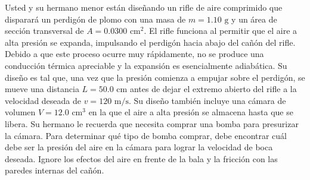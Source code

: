 \item Usted y su hermano menor están diseñando un rifle de aire comprimido que disparará un perdigón de plomo con una masa de $m = 1.10\text{ g}$ y un área de sección transversal de $A = 0.0300\text{ cm}^2$. El rifle funciona al permitir que el aire a alta presión se expanda, impulsando el perdigón hacia abajo del cañón del rifle. Debido a que este proceso ocurre muy rápidamente, no se produce una conducción térmica apreciable y la expansión es esencialmente adiabática. Su diseño es tal que, una vez que la presión comienza a empujar sobre el perdigón, se mueve una distancia $L = 50.0\text{ cm}$ antes de dejar el extremo abierto del rifle a la velocidad deseada de $v = 120\text{ m/s}$. Su diseño también incluye una cámara de volumen $V = 12.0\text{ cm}^3$ en la que el aire a alta presión se almacena hasta que se libera. Su hermano le recuerda que necesita comprar una bomba para presurizar la cámara. Para determinar qué tipo de bomba comprar, debe encontrar cuál debe ser la presión del aire en la cámara para lograr la velocidad de boca deseada. Ignore los efectos del aire en frente de la bala y la fricción con las paredes internas del cañón.
